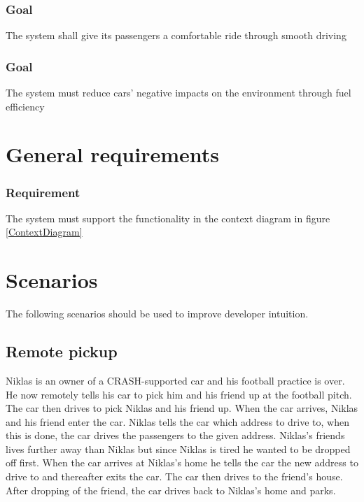 \documentclass{article}
\begin{document}
    \subsubsection{Goal}
\hfill \break 
\- \- \-The system shall give its passengers a comfortable ride through smooth driving
    \subsubsection{Goal}
\hfill \break 
\- \- \-The system must reduce cars' negative impacts on the environment through fuel efficiency
\bigskip

\section{General requirements}
\setcounter{subsubsection}{0}
    \subsubsection{Requirement}
\hfill \break 
\- \- \-The system must support the functionality in the context diagram in figure \ref{ContextDiagram}

\section{Scenarios}
\noindent The following scenarios should be used to improve developer intuition. 

\subsection {Remote pickup}
\noindent Niklas is an owner of a CRASH-supported car and his football practice is over. He now remotely tells his car to pick him and his friend up at the football pitch. The car then drives to pick Niklas and his friend up. When the car arrives, Niklas and his friend enter the car. Niklas tells the car which address to drive to, when this is done, the car drives the passengers to the given address. Niklas's friends lives further away than Niklas but since Niklas is tired he wanted to be dropped off first. When the car arrives at Niklas's home he tells the car the new address to drive to and thereafter exits the car. The car then drives to the friend's house. After dropping of the friend, the car drives back to Niklas's home and parks.
\end{document}

